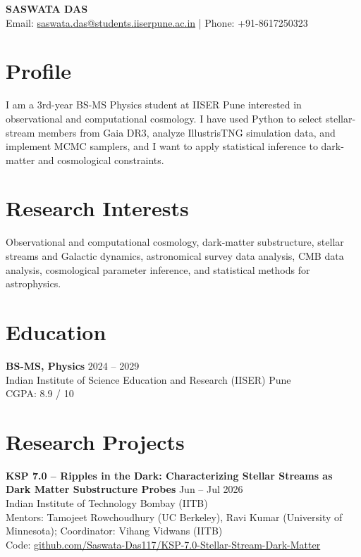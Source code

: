 \documentclass[11pt,a4paper]{article}
\begin{document}
\begin{center}
{\LARGE \textbf{SASWATA DAS}} \\[4pt]
Email: \href{mailto:saswata.das@students.iiserpune.ac.in}
{saswata.das@students.iiserpune.ac.in}
\quad | \quad
Phone: +91-8617250323
\end{center}

\vspace{4pt}

\section*{Profile}
 
I am a 3rd-year BS-MS Physics student at IISER Pune interested in observational and computational cosmology. I have used Python to select stellar-stream members from Gaia DR3, analyze IllustrisTNG simulation data, and implement MCMC samplers, and I want to apply statistical inference to dark-matter and cosmological constraints.
 
\section*{Research Interests}
 
Observational and computational cosmology, dark-matter substructure, stellar streams and Galactic dynamics, astronomical survey data analysis, CMB data analysis, cosmological parameter inference, and statistical methods for astrophysics.
 
\section*{Education}
 
\textbf{BS-MS, Physics} \hfill 2024 -- 2029 \\
Indian Institute of Science Education and Research (IISER) Pune \\
CGPA: 8.9 / 10
 
\section*{Research Projects}
 
\textbf{KSP 7.0 -- Ripples in the Dark: Characterizing Stellar Streams as Dark Matter Substructure Probes}
\hfill Jun -- Jul 2026 \\
Indian Institute of Technology Bombay (IITB) \\
Mentors: Tamojeet Rowchoudhury (UC Berkeley), Ravi Kumar (University of Minnesota); Coordinator: Vihang Vidwans (IITB) \\
Code: \href{https://github.com/Saswata-Das117/KSP-7.0-Stellar-Stream-Dark-Matter}{github.com/Saswata-Das117/KSP-7.0-Stellar-Stream-Dark-Matter}
\end{document}
